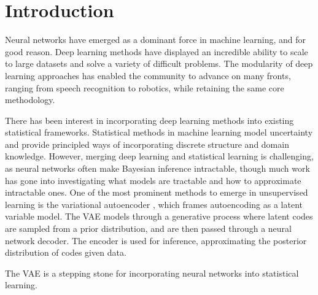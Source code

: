 \chapter{Introduction}

Neural networks have emerged
as a dominant force
in machine learning,
and for good reason.
Deep learning methods
have displayed an incredible
ability to scale to large datasets
and solve a variety of
difficult problems.
The modularity of deep learning 
approaches has enabled the community
to advance on many fronts,
ranging from speech recognition
to robotics, while retaining
the same core methodology.

There has been interest
in incorporating deep learning
methods into existing
statistical frameworks.
Statistical methods in machine learning
model uncertainty and provide
principled ways of incorporating
discrete structure and 
domain knowledge.
However, merging deep learning
and statistical learning
is challenging, as neural networks
often make Bayesian inference
intractable,
though much
work has gone into investigating
what models are tractable
and how to approximate
intractable ones.
One of the most prominent
methods to emerge in unsupervised learning
is the variational autoencoder \citep[VAE; ][]{Kingma2014, Rezende2014},
which frames autoencoding
as a latent variable model.
The VAE models
through a generative process
where latent codes are sampled
from a prior distribution,
and are then passed through a
neural network decoder. 
The encoder is used for inference,
approximating the posterior
distribution of codes given data.

The VAE is a stepping stone
for incorporating
neural networks into
statistical learning.
